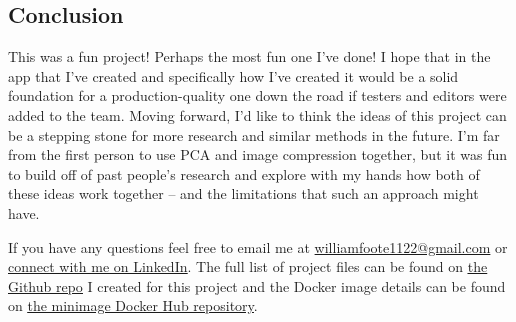 \documentclass[10pt]{article}
\begin{document}
\begin{multicols*}{2}
\section{Conclusion}

This was a fun project! Perhaps the most fun one I've done! I hope that in the app that I've created and specifically how I've created it would be a solid foundation for a production-quality one down the road if testers and editors were added to the team. Moving forward, I'd like to think the ideas of this project can be a stepping stone for more research and similar methods in the future. I'm far from the first person to use PCA and image compression together, but it was fun to build off of past people's research and explore with my hands how both of these ideas work together -- and the limitations that such an approach might have.

If you have any questions feel free to email me at \underline{williamfoote1122@gmail.com} or \underline{\href{https://www.linkedin.com/in/william-foote}{connect with me on LinkedIn}}. The full list of project files can be found on \underline{\href{https://github.com/williamfoote/minimage}{the Github repo}} I created for this project and the Docker image details can be found on \underline{\href{https://hub.docker.com/repository/docker/williamfoote/minimage}{the minimage Docker Hub repository}}.

\end{multicols*}
	
\end{document}
